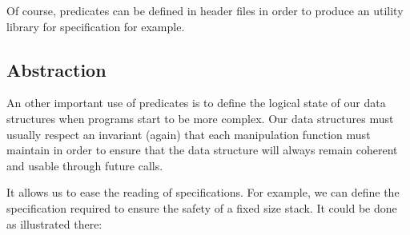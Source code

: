 \documentclass[12pt,francais,]{scrbook}
\begin{document}
Of course, predicates can be defined in header files in order to produce
an utility library for specification for example.

\subsection{Abstraction}\label{abstraction}

An other important use of predicates is to define the logical state of
our data structures when programs start to be more complex. Our data
structures must usually respect an invariant (again) that each
manipulation function must maintain in order to ensure that the data
structure will always remain coherent and usable through future calls.

It allows us to ease the reading of specifications. For example, we can
define the specification required to ensure the safety of a fixed size
stack. It could be done as illustrated there:
\end{document}
